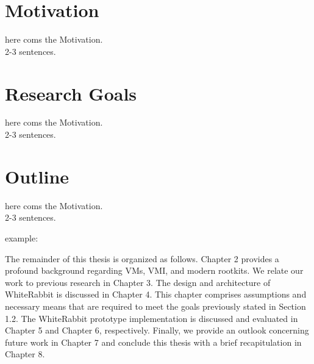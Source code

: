 \section{Motivation}
here coms the Motivation.
\\
2-3 sentences.

\section{Research Goals}
here coms the Motivation.
\\
2-3 sentences.

\section{Outline}
here coms the Motivation.
\\
2-3 sentences.

example: 

The remainder of this thesis is organized as follows. Chapter 2 provides a profound
background regarding VMs, VMI, and modern rootkits. We relate our work to previous
research in Chapter 3. The design and architecture of WhiteRabbit is discussed in
Chapter 4. This chapter comprises assumptions and necessary means that are required
to meet the goals previously stated in Section 1.2. The WhiteRabbit prototype implementation
is discussed and evaluated in Chapter 5 and Chapter 6, respectively. Finally,
we provide an outlook concerning future work in Chapter 7 and conclude this thesis
with a brief recapitulation in Chapter 8.


